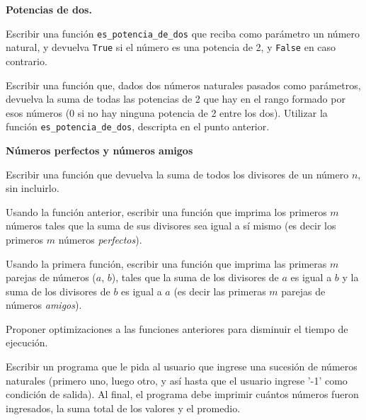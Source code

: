 \begin{ejercicio}
{\bf Potencias de dos.}
\begin{partes}
    \item Escribir una función \verb!es_potencia_de_dos! que reciba como parámetro
un número natural, y devuelva \verb!True! si el número es una potencia de 2,
y \verb!False! en caso contrario.
    \item Escribir una función que, dados dos números naturales pasados como
parámetros, devuelva la suma de todas las potencias de 2 que hay en el
rango formado por esos números (0 si no hay ninguna potencia de 2 entre los
dos). Utilizar la función \verb!es_potencia_de_dos!, descripta en el
punto anterior.
\end{partes}
\end{ejercicio}


\begin{ejercicio}
{\bf Números perfectos y números amigos}
\begin{partes}
    \item Escribir una función que devuelva la suma de todos los divisores de
un número $n$, sin incluirlo.
    \item Usando la función anterior, escribir una función que imprima los
primeros $m$ números tales que la suma de sus divisores sea igual a sí
mismo (es decir los primeros $m$ números {\it perfectos}).
    \item Usando la primera función, escribir una función que imprima las
primeras $m$ parejas de números ($a$, $b$), tales que la suma de los
divisores de $a$ es igual a $b$ y la suma de los divisores de $b$ es igual
a $a$ (es decir las primeras $m$ parejas de números {\it amigos}).
    \item Proponer optimizaciones a las funciones anteriores para disminuir el
tiempo de ejecución.
\end{partes}
\end{ejercicio}

\begin{ejercicio}
Escribir un programa que le pida al usuario que ingrese una sucesión
de números naturales (primero uno, luego otro, y así hasta que el
usuario ingrese '-1' como condición de salida). Al final, el programa
debe imprimir cuántos números fueron ingresados, la suma total de los
valores y el promedio.
\end{ejercicio}

